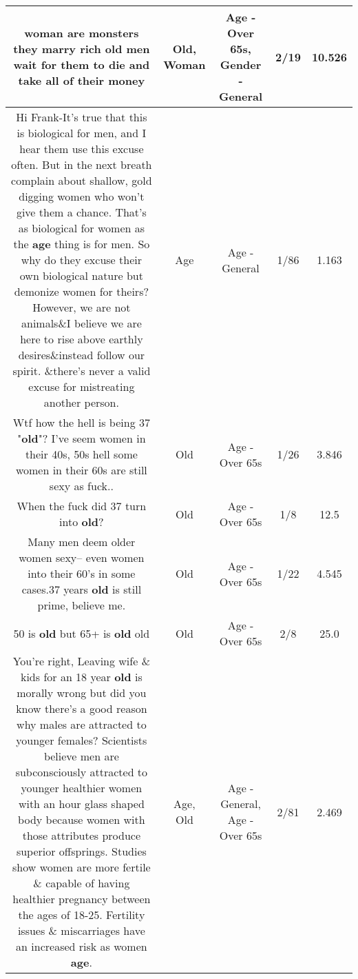 \documentclass[11pt]{article}
\newlength\mylength
\begin{document}
\begin{center}
\begin{longtable}{|C{.65\mylength}|C{.30\mylength}|C{.12\mylength}|C{.12\mylength}|C{.12\mylength}|}
  \small woman are monsters they marry rich \textbf{old} men wait for them to die and take all of their money\normalsize   & Old, Woman & Age - Over 65s, Gender - General & 2/19 & 10.526 \\  \hline
  \small Hi Frank-It's true that this is biological for men, and I hear them use this excuse often. But in the next breath complain about shallow, gold digging women who won't give them a chance. That's as biological for women as the \textbf{age} thing is for men. So why do they excuse their own biological nature but demonize women for theirs? However, we are not animals\&I believe we are here to rise above earthly desires\&instead follow our spirit. \&there's never a valid excuse for mistreating another person.\normalsize   & Age & Age - General & 1/86 & 1.163 \\  \hline
  \small Wtf how the hell is being 37 "\textbf{old}"? I've seem women in their 40s, 50s hell some women in their 60s are still sexy as fuck..\normalsize   & Old & Age - Over 65s & 1/26 & 3.846 \\  \hline
  \small When the fuck did 37 turn into \textbf{old}?\normalsize   & Old & Age - Over 65s & 1/8 & 12.5 \\  \hline
  \small Many men deem older women sexy-- even women into their 60's in some cases.37 years \textbf{old} is still prime, believe me.\normalsize   & Old & Age - Over 65s & 1/22 & 4.545 \\  \hline
  \small 50 is \textbf{old} but 65+   is \textbf{old} old\normalsize   & Old & Age - Over 65s & 2/8 & 25.0 \\  \hline
  \small You're right, Leaving wife \& kids for an 18 year \textbf{old} is morally wrong but did you know there's a good reason why males are attracted to younger females? Scientists believe men are subconsciously attracted to younger healthier women with an hour glass shaped body because women with those attributes produce superior offsprings. Studies show women are more fertile \& capable of having healthier pregnancy between the ages of 18-25. Fertility issues \& miscarriages have an increased risk as women \textbf{age}.\normalsize   & Age, Old & Age - General, Age - Over 65s & 2/81 & 2.469 \\  \hline

\end{longtable}
\end{center}
\end{document}
